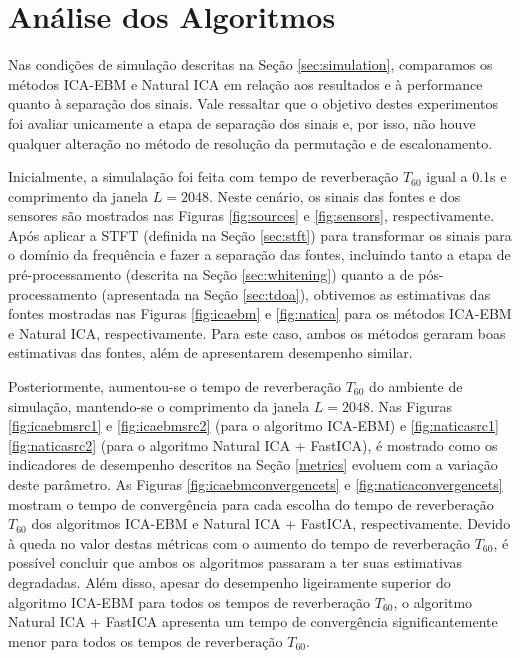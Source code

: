  \section{Análise dos Algoritmos}\label{sec:analysis}
    
    Nas condições de simulação descritas na Seção \ref{sec:simulation}, comparamos os métodos ICA-EBM e Natural ICA em relação aos resultados e à performance quanto à separação dos sinais. Vale ressaltar que o objetivo destes experimentos foi avaliar unicamente a etapa de separação dos sinais e, por isso, não houve qualquer alteração no método de resolução da permutação e de escalonamento. 
    
    Inicialmente, a simulalação foi feita com tempo de reverberação $T_{60}$ igual a 0.1s e comprimento da janela $L=2048$. Neste cenário, os sinais das fontes e dos sensores são mostrados nas Figuras \ref{fig:sources} e \ref{fig:sensors}, respectivamente. Após aplicar a STFT (definida na Seção \ref{sec:stft}) para transformar os sinais para o domínio da frequência e fazer a separação das fontes, incluindo tanto a etapa de pré-processamento (descrita na Seção \ref{sec:whitening}) quanto a de pós-processamento (apresentada na Seção \ref{sec:tdoa}), obtivemos as estimativas das fontes mostradas nas Figuras \ref{fig:icaebm} e \ref{fig:natica} para os métodos ICA-EBM e Natural ICA, respectivamente. Para este caso, ambos os métodos geraram boas estimativas das fontes, além de apresentarem desempenho similar.
    
    Posteriormente, aumentou-se o tempo de reverberação $T_{60}$ do ambiente de simulação, mantendo-se o comprimento da janela $L=2048$. Nas Figuras \ref{fig:icaebmsrc1} e \ref{fig:icaebmsrc2} (para o algoritmo ICA-EBM) e \ref{fig:naticasrc1} \ref{fig:naticasrc2} (para o algoritmo Natural ICA + FastICA), é mostrado como os indicadores de desempenho descritos na Seção \ref{metrics} evoluem com a variação deste parâmetro. As Figuras \ref{fig:icaebmconvergencets} e \ref{fig:naticaconvergencets} mostram o tempo de convergência para cada escolha do tempo de reverberação $T_{60}$ dos algoritmos ICA-EBM e Natural ICA + FastICA, respectivamente. Devido à queda no valor destas métricas com o aumento do tempo de reverberação $T_{60}$, é possível concluir que ambos os algoritmos passaram a ter suas estimativas degradadas. Além disso, apesar do desempenho ligeiramente superior do algoritmo ICA-EBM para todos os tempos de reverberação $T_{60}$, o algoritmo Natural ICA + FastICA apresenta um tempo de convergência significantemente menor para todos os tempos de reverberação $T_{60}$.
    
